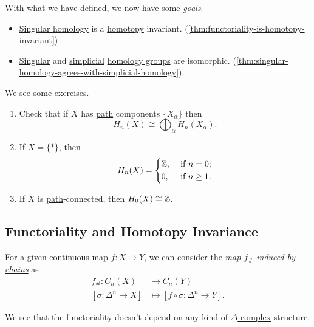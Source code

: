 With what we have defined, we now have some \emph{goals}.
\begin{itemize}
	\item \hyperref[def:singular-homology-group]{Singular homology} is a \hyperref[def:homotopy]{homotopy} invariant. (\autoref{thm:functoriality-is-homotopy-invariant})
	\item \hyperref[def:singular-homology-group]{Singular} and \hyperref[def:simplicial-homology-group]{simplicial} \hyperref[def:homology-group]{homology groups} are isomorphic. (\autoref{thm:singular-homology-agrees-with-simplicial-homology})
\end{itemize}

\begin{exercise}
	We see some exercises.
	\begin{enumerate}
		\item Check that if \(X\) has \hyperref[def:path]{path} components \(\{X_\alpha\}\) then
		      \[
			      H_n(X) \cong \bigoplus_\alpha H_n(X_\alpha).
		      \]
		\item If \(X = \{\ast\}\), then
		      \[
			      H_n(X) = \begin{dcases}
				      \mathbb{\MakeUppercase{z}}, & \text{ if } n=0 ;     \\
				      0,                          & \text{ if } n\geq 1 .
			      \end{dcases}
		      \]
		\item If \(X\) is \hyperref[def:path]{path}-connected, then \(H_0(X) \cong \mathbb{\MakeUppercase{z}}\).
	\end{enumerate}

\end{exercise}

\subsection{Functoriality and Homotopy Invariance}
\begin{definition}\label{def:induced-map-on-chains}
	For a given continuous map \(f \colon X \to Y\), we can consider the \emph{map \(f_{\#}\) induced by \hyperref[def:chain-complex]{chains}} as
	\[
		\begin{split}
			f_{\#} \colon C_n(X)           & \to C_n(Y)                                      \\
			[\sigma \colon \Delta^n \to X] & \mapsto [f \circ \sigma \colon \Delta^n \to Y].
		\end{split}
	\]
\end{definition}
\begin{remark}
	We see that the functoriality doesn't depend on any kind of \hyperref[def:delta-complex]{\(\Delta \)-complex} structure.
\end{remark}

